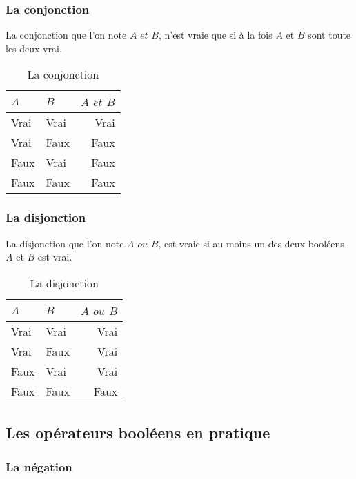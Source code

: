 \subsubsection{La conjonction}
La conjonction que l'on note $A$ $et$ $B$, n'est vraie que si à la fois $A$ et $B$ sont toute les deux vrai.
\begin{table}[h]
\centering
\begin{tabu} spread \linewidth {|l|l|r|}
\hline
$A$ & $B$ & $A$ $et$ $B$ \\ \hline
Vrai & Vrai & Vrai \\ \hline
Vrai & Faux & Faux \\ \hline
Faux & Vrai & Faux \\ \hline
Faux & Faux & Faux \\ \hline
\end{tabu}
\caption{La conjonction}
\end{table}
\subsubsection{La disjonction}
La disjonction que l'on note $A$ $ou$ $B$, est vraie si au moins un des deux booléens $A$ et $B$ est vrai.
\begin{table}[h]
\centering
\begin{tabu} spread \linewidth {|l|l|r|}
\hline
$A$ & $B$ & $A$ $ou$ $B$ \\ \hline
Vrai & Vrai & Vrai \\ \hline
Vrai & Faux & Vrai \\ \hline
Faux & Vrai & Vrai \\ \hline
Faux & Faux & Faux \\ \hline
\end{tabu}
\caption{La disjonction}
\end{table}
\subsection{Les opérateurs booléens en pratique}
\subsubsection{La négation}
